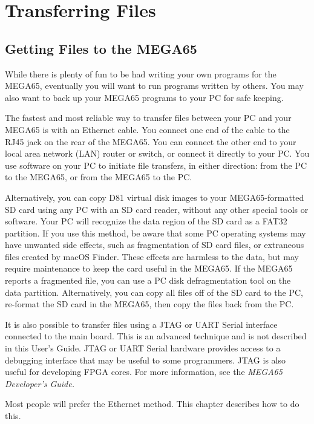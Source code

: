 \chapter{Transferring Files}

\section{Getting Files to the MEGA65}
\label{cha:transferring-files}

While there is plenty of fun to be had writing your own programs for the MEGA65, eventually you will want to run programs written by others. You may also want to back up your MEGA65 programs to your PC for safe keeping.

The fastest and most reliable way to transfer files between your PC and your MEGA65 is with an Ethernet cable. You connect one end of the cable to the RJ45 jack on the rear of the MEGA65. You can connect the other end to your local area network (LAN) router or switch, or connect it directly to your PC. You use software on your PC to initiate file transfers, in either direction: from the PC to the MEGA65, or from the MEGA65 to the PC.

Alternatively, you can copy D81 virtual disk images to your MEGA65-formatted SD card using any PC with an SD card reader, without any other special tools or software. Your PC will recognize the data region of the SD card as a FAT32 partition. If you use this method, be aware that some PC operating systems may have unwanted side effects, such as fragmentation of SD card files, or extraneous files created by macOS Finder. These effects are harmless to the data, but may require maintenance to keep the card useful in the MEGA65. If the MEGA65 reports a fragmented file, you can use a PC disk defragmentation tool on the data partition. Alternatively, you can copy all files off of the SD card to the PC, re-format the SD card in the MEGA65, then copy the files back from the PC.

It is also possible to transfer files using a JTAG or UART Serial interface connected to the main board. This is an advanced technique and is not described in this User's Guide. JTAG or UART Serial hardware provides access to a debugging interface that may be useful to some programmers. JTAG is also useful for developing FPGA cores. For more information, see the {\it MEGA65 Developer's Guide.}

Most people will prefer the Ethernet method. This chapter describes how to do this.

